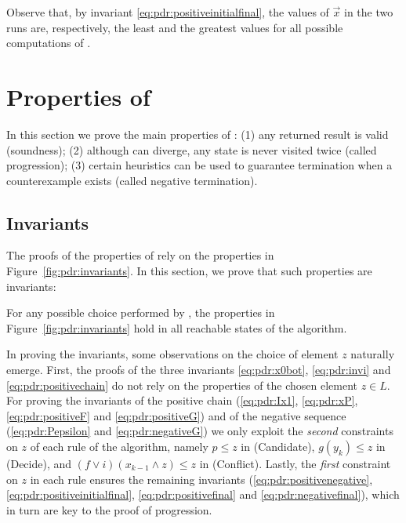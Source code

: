 \begin{example}
	\noindent
	Observe that, by invariant \eqref{eq:pdr:positiveinitialfinal}, the values of $\vec{x}$ in the two runs are, respectively, the least and the greatest values for all possible computations of {\APDR}.
\end{example}

\section{Properties of {\APDR}}\label{sec:pdr:properties}

In this section we prove the main properties of {\APDR}: (1) any returned result is valid (soundness); (2) although {\APDR} can diverge, any state is never visited twice (called progression); (3) certain heuristics can be used to guarantee termination when a counterexample exists (called negative termination).

\subsection{Invariants}\label{sec:pdr:soundness}
The proofs of the properties of {\APDR} rely on the properties in Figure~\ref{fig:pdr:invariants}. In this section, we prove that such properties are invariants:
\begin{prop}\label{prop:pdr:invariants-valid}
	For any possible choice performed by {\APDR}, the properties in Figure~\ref{fig:pdr:invariants} hold in all reachable states of the algorithm.
\end{prop}

In proving the invariants, some observations on the choice of element $z$ naturally emerge.
First, the proofs of the three invariants \eqref{eq:pdr:x0bot}, \eqref{eq:pdr:invi} and \eqref{eq:pdr:positivechain} do not rely on the properties of the chosen element $z \in L$.
For proving the invariants of the positive chain (\eqref{eq:pdr:Ix1}, \eqref{eq:pdr:xP}, \eqref{eq:pdr:positiveF} and \eqref{eq:pdr:positiveG}) and of the negative sequence (\eqref{eq:pdr:Pepsilon} and \eqref{eq:pdr:negativeG}) we only exploit the \emph{second} constraints on $z$ of each rule of the algorithm, namely $p \le z$ in (Candidate), $g(y_k) \le z$ in (Decide), and $(f \lor i)(x_{k-1} \land z) \le z$ in (Conflict).
Lastly, the \emph{first} constraint on $z$ in each rule ensures the remaining invariants (\eqref{eq:pdr:positivenegative}, \eqref{eq:pdr:positiveinitialfinal}, \eqref{eq:pdr:positivefinal} and \eqref{eq:pdr:negativefinal}), which in turn are key to the proof of progression.

